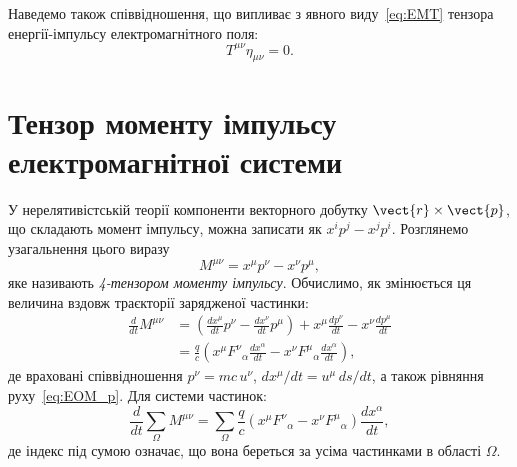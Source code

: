 Наведемо також співвідношення, що випливає з явного виду~\eqref{eq:EMT} тензора енергії-імпульсу електромагнітного поля:
\begin{equation*}
    T^{\mu\nu}\eta_{\mu\nu} = 0.
\end{equation*}

\section{Тензор моменту імпульсу електромагнітної системи}

У нерелятивістській теорії компоненти векторного добутку $\vect{r}\times\vect{p}$, що складають момент імпульсу, можна
записати як $x^i p^j - x^j p^i$. Розглянемо узагальнення цього виразу
\begin{equation}\label{eq:M_particle}
    M^{\mu\nu} = x^{\mu}p^{\nu} - x^{\nu}p^{\mu},
\end{equation}
яке називають \emph{4-тензором моменту імпульсу}. Обчислимо, як змінюється ця величина
вздовж траєкторії зарядженої частинки:
\begin{align*}
    \frac{d}{dt}M^{\mu\nu}
     & = \left(\frac{dx^{\mu}}{dt}p^{\nu} - \frac{dx^{\nu}}{dt}p^{\mu}\right)
    + x^{\mu}\frac{dp^{\nu}}{dt} - x^{\nu}\frac{dp^{\mu}}{dt}                 \\
     & = \frac{q}{c}\!\left(
    x^{\mu}F^{\nu}{}_{\alpha}\frac{dx^{\alpha}}{dt}
    - x^{\nu}F^{\mu}{}_{\alpha}\frac{dx^{\alpha}}{dt}
    \right),
\end{align*}
%
де враховані співвідношення $p^{\nu}=mc\,u^{\nu}$, $dx^{\mu}/dt=u^{\mu}\,ds/dt$, а також рівняння руху~\eqref{eq:EOM_p}.
Для системи частинок:
\begin{equation*}
    \frac{d}{dt}\sum_{\Omega}M^{\mu\nu}
    = \sum_{\Omega}\frac{q}{c}\!\left(
    x^{\mu}F^{\nu}{}_{\alpha} - x^{\nu}F^{\mu}{}_{\alpha}
    \right)\frac{dx^{\alpha}}{dt},
\end{equation*}
де індекс під сумою означає, що вона береться за усіма частинками в області $\Omega$.

